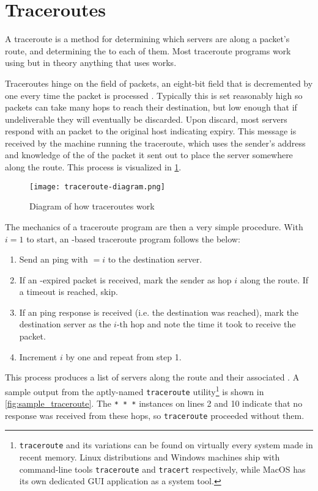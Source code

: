 \section{Traceroutes}\label{sec:background_traceroutes}

A traceroute is a method for determining which servers are along a packet's route, and determining the \rtt to each of them. Most traceroute programs work using \icmp but in theory anything that uses \ip works.

Traceroutes hinge on the \ttl field of \ip packets, an eight-bit field that is decremented by one every time the packet is processed \cite{rfc791}. Typically this is set reasonably high so packets can take many hops to reach their destination, but low enough that if undeliverable they will eventually be discarded. Upon discard, most servers respond with an \icmp packet to the original host indicating \ttl expiry. This message is received by the machine running the traceroute, which uses the sender's \ip address and knowledge of the \ttl of the packet it sent out to place the server somewhere along the route. This process is visualized in \cref{fig:traceroute_diagram}.

\begin{figure}[htb]
    \centering
    \texttt{[image: traceroute-diagram.png]}
    \caption{Diagram of how traceroutes work}
    \label{fig:traceroute_diagram}
\end{figure}

The mechanics of a traceroute program are then a very simple procedure. With $i=1$ to start, an \icmp-based traceroute program follows the below:

\begin{enumerate}
    \item Send an \icmp ping with \TTL$=i$ to the destination server.
    \item If an \icmp \ttl-expired packet is received, mark the sender as hop $i$ along the route. If a timeout is reached, skip.
    \item If an \icmp ping response is received (i.e. the destination was reached), mark the destination server as the $i$-th hop and note the time it took to receive the packet.
    \item Increment $i$ by one and repeat from step 1.
\end{enumerate}

This process produces a list of servers along the route and their associated \rtts. A sample output from the aptly-named \texttt{traceroute} utility\footnote{\texttt{traceroute} and its variations can be found on virtually every system made in recent memory. Linux distributions and Windows machines ship with command-line tools \texttt{traceroute} and \texttt{tracert} respectively, while MacOS has its own dedicated GUI application as a system tool.} is shown in \cref{fig:sample_traceroute}. The \texttt{* * *} instances on lines 2 and 10 indicate that no response was received from these hops, so \texttt{traceroute} proceeded without them.

